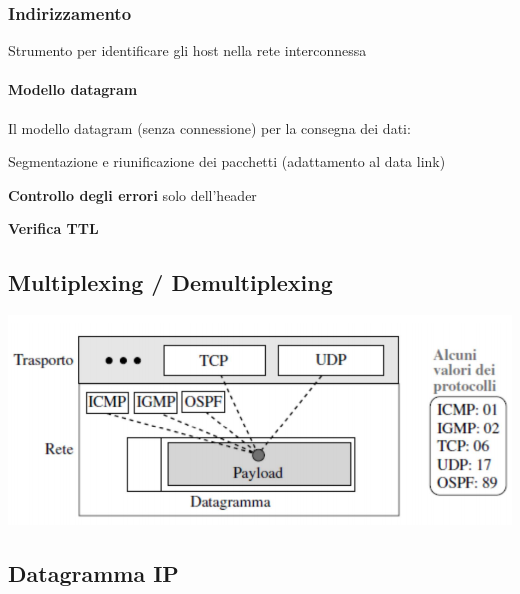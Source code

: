 \documentclass[10pt]{article}
\begin{document}
\subsubsection{Indirizzamento}
Strumento per identificare gli host nella rete interconnessa
\paragraph{Modello datagram} Il modello datagram (senza connessione) per la consegna dei dati:
\begin{list}{}{}
\item Segmentazione e riunificazione dei pacchetti (adattamento al data link)
\item \textbf{Controllo degli errori} solo dell'header
\item \textbf{Verifica TTL}
\end{list}
\pagebreak
\subsection{Multiplexing / Demultiplexing}
\begin{center}
\includegraphics[scale=0.7]{ipmuxdemux.png}
\end{center}
\subsection{Datagramma IP}
\end{document}
